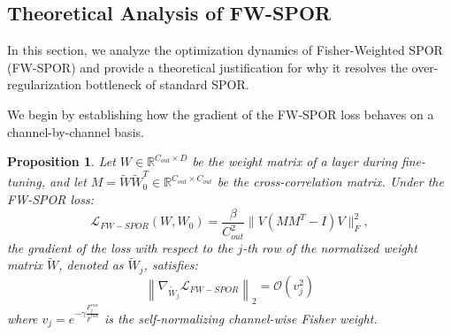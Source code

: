 \documentclass{article}
\theoremstyle{plain}
\newtheorem{proposition}[theorem]{Proposition}
\theoremstyle{definition}
\theoremstyle{remark}
\begin{document}
\subsection{Theoretical Analysis of FW-SPOR}
In this section, we analyze the optimization dynamics of Fisher-Weighted SPOR (FW-SPOR) and provide a theoretical justification for why it resolves the over-regularization bottleneck of standard SPOR.

We begin by establishing how the gradient of the FW-SPOR loss behaves on a channel-by-channel basis.
\begin{proposition}\label{prop:grad_fw_spor}
Let $W \in \mathbb{R}^{C_{out} \times D}$ be the weight matrix of a layer during fine-tuning, and let $M = \tilde{W}\tilde{W}_0^T \in \mathbb{R}^{C_{out} \times C_{out}}$ be the cross-correlation matrix. Under the FW-SPOR loss:
\begin{equation}
    \mathcal{L}_{FW-SPOR}(W, W_0) = \frac{\beta}{C_{out}^2} \| V (M M^T - I) V \|_F^2,
\end{equation}
the gradient of the loss with respect to the $j$-th row of the normalized weight matrix $\tilde{W}$, denoted as $\tilde{W}_j$, satisfies:
\begin{equation}
    \left\| \nabla_{\tilde{W}_j} \mathcal{L}_{FW-SPOR} \right\|_2 = \mathcal{O}(v_j^2)
\end{equation}
where $v_j = e^{-\gamma \frac{F^{row}_j}{\bar{F}^{row}}}$ is the self-normalizing channel-wise Fisher weight.
\end{proposition}
\end{document}
